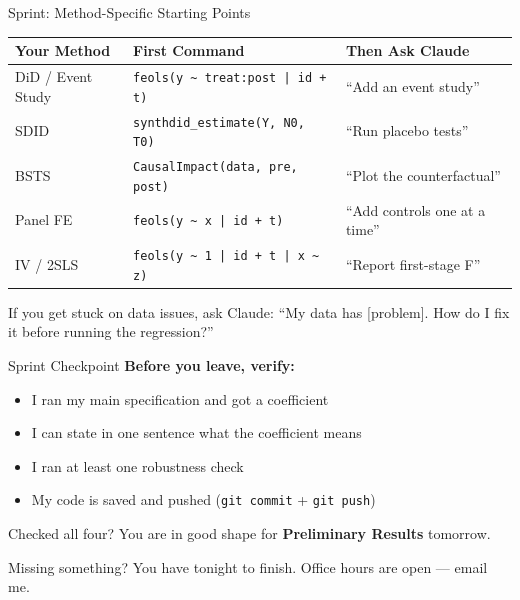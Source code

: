 \begin{frame}{Sprint: Method-Specific Starting Points}
  \small
  \begin{tabular}{@{}p{2.5cm}p{4.5cm}p{3.8cm}@{}}
    \toprule
    \textbf{Your Method} & \textbf{First Command} & \textbf{Then Ask Claude} \\
    \midrule
    DiD / Event Study & \texttt{feols(y \textasciitilde{} treat:post | id + t)} & ``Add an event study'' \\[4pt]
    SDID & \texttt{synthdid\_estimate(Y, N0, T0)} & ``Run placebo tests'' \\[4pt]
    BSTS & \texttt{CausalImpact(data, pre, post)} & ``Plot the counterfactual'' \\[4pt]
    Panel FE & \texttt{feols(y \textasciitilde{} x | id + t)} & ``Add controls one at a time'' \\[4pt]
    IV / 2SLS & \texttt{feols(y \textasciitilde{} 1 | id + t | x \textasciitilde{} z)} & ``Report first-stage F'' \\
    \bottomrule
  \end{tabular}

  \vspace{8pt}

  If you get stuck on data issues, ask Claude: ``My data has [problem]. How do I fix it before running the regression?''
\end{frame}

\begin{frame}{Sprint Checkpoint}
  \textbf{Before you leave, verify:}

  \vspace{8pt}

  \begin{itemize}
    \item[$\square$] I ran my main specification and got a coefficient
    \item[$\square$] I can state in one sentence what the coefficient means
    \item[$\square$] I ran at least one robustness check
    \item[$\square$] My code is saved and pushed (\texttt{git commit} + \texttt{git push})
  \end{itemize}

  \vspace{8pt}

  Checked all four? You are in good shape for \textbf{Preliminary Results} tomorrow.

  \vspace{4pt}

  Missing something? You have tonight to finish. Office hours are open --- email me.
\end{frame}

